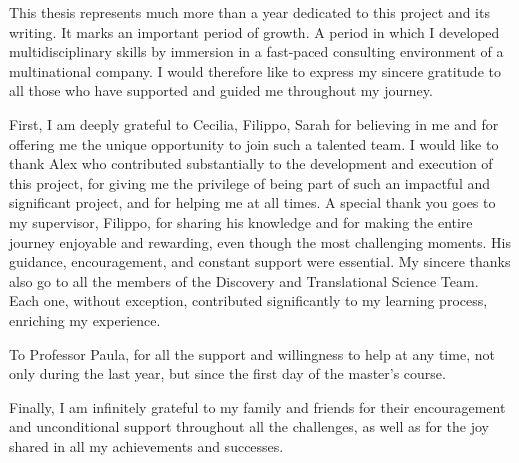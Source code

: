 ﻿%

%

\begin{ntacknowledgements}

This thesis represents much more than a year dedicated to this project and its writing.
It marks an important period of growth. A period in which I developed multidisciplinary skills by immersion in a fast-paced consulting environment of a multinational company.
I would therefore like to express my sincere gratitude to all those who have supported and guided me throughout my journey. 

First, I am deeply grateful to Cecilia, Filippo, Sarah for believing in me and for offering me the unique opportunity to join such a talented team. 
I would like to thank Alex who contributed substantially to the development and execution of this project, for giving me the privilege of being part of such an impactful and significant project, and for helping me at all times.
A special thank you goes to my supervisor, Filippo, for sharing his knowledge and for making the entire journey enjoyable and rewarding, even though the most challenging moments.
His guidance, encouragement, and constant support were essential.
My sincere thanks also go to all the members of the Discovery and Translational Science Team. Each one, without exception, contributed significantly to my learning process, enriching my experience.

To Professor Paula, for all the support and willingness to help at any time, not only during the last year, but since the first day of the master's course.

Finally, I am infinitely grateful to my family and friends for their encouragement and unconditional support throughout all the challenges, as well as for the joy shared in all my achievements and successes.

\end{ntacknowledgements}
